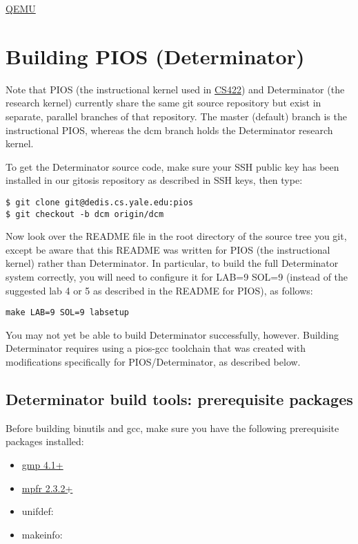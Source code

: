 \href{http://wiki.qemu.org/download/qemu-doc.html#pcsys_005fmonitor}{QEMU}
\section{Building PIOS (Determinator)}
Note that PIOS (the instructional kernel used in \href{http://zoo.cs.yale.edu/classes/cs422}{CS422}) and Determinator (the research kernel) currently share the same git source repository but exist in separate, parallel branches of that repository. The master (default) branch is the instructional PIOS, whereas the dcm branch holds the Determinator research kernel.

To get the Determinator source code, make sure your SSH public key has been installed in our gitosis repository as described in SSH keys, then type:

\begin{verbatim}
$ git clone git@dedis.cs.yale.edu:pios
$ git checkout -b dcm origin/dcm
\end{verbatim}

Now look over the README file in the root directory of the source tree you git, except be aware that this README was written for PIOS (the instructional kernel) rather than Determinator. In particular, to build the full Determinator system correctly, you will need to configure it for LAB=9 SOL=9 (instead of the suggested lab 4 or 5 as described in the README for PIOS), as follows:

\verb|make LAB=9 SOL=9 labsetup|

You may not yet be able to build Determinator successfully, however. Building Determinator requires using a pios-gcc toolchain that was created with modifications specifically for PIOS/Determinator, as described below.

\subsection{Determinator build tools: prerequisite packages}
Before building binutils and gcc, make sure you have the following prerequisite packages installed:
\begin{itemize}
\item \href{http://gmplib.org/}{gmp 4.1+}
\item \href{http://www.mpfr.org/}{mpfr 2.3.2+}
\item unifdef: 
\item makeinfo: 
\end{itemize}

